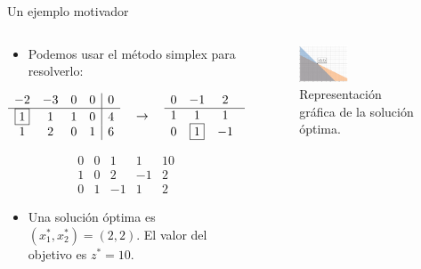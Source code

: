 \documentclass{beamer}
\begin{document}
\begin{frame}{Un ejemplo motivador}
\begin{columns}
\begin{column}{0.6\linewidth}

    \begin{itemize}
        \item Podemos usar el método simplex para resolverlo:
    \end{itemize}
    
    \[
    \begin{array}{cccc|c}
        -2 & -3 & 0 & 0 & 0 \\
        \hline
        \fbox{1} & 1 & 1 & 0 & 4 \\
        1 & 2 & 0 & 1 & 6 
    \end{array}
    \quad \rightarrow \quad
    \begin{array}{cccc|c}
        0 & -1 & 2 & 0 & 8 \\
        \hline
        1 & 1 & 1 & 0 & 4 \\
        0 & \fbox{1} & -1 & 1 & 2 
    \end{array}
    \]

    \[
    \begin{array}{cccc|c}
        0 & 0 & 1 & 1 & 10 \\
        \hline
        1 & 0 & 2 & -1 & 2 \\
        0 & 1 & -1 & 1 & 2 
    \end{array}
    \]

    \vspace{0.3cm}

    \begin{itemize}
        \item Una solución óptima es \( (x_1^*, x_2^*) = (2, 2) \). El valor del objetivo es \( z^* = 10 \).
    \end{itemize}
\end{column}
\begin{column}{0.4\linewidth}
    \begin{figure}[h]
        \centering
        \includegraphics[width=0.4\textwidth]{images/simplex_dual1.png}
        \caption{Representación gráfica de la solución óptima.}
    \end{figure}
\end{column}
\end{columns}
\end{frame}
\end{document}
